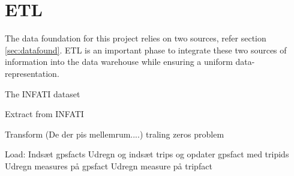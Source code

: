 \section{ETL}\label{sec:ETL}
The data foundation for this project relies on two sources, refer section \ref{sec:datafound}. ETL is an important phase to integrate these two sources of information into the data warehouse while ensuring a uniform data-representation. 

The INFATI dataset

Extract from INFATI





Transform (De der pis mellemrum....) traling zeros problem

















Load:
Indsæt gpsfacts
Udregn og indsæt trips og opdater gpsfact med tripids
Udregn measures på gpsfact
Udregn measure på tripfact


